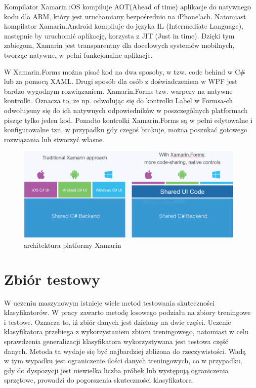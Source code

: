 \documentclass[brudnopis]{xmgr}
\begin{document}
Kompilator Xamarin.iOS kompiluje AOT(Ahead of time) aplikacje do natywnego kodu dla ARM, który jest uruchamiany bezpośrednio na iPhone’ach.
Natomiast kompilator Xamarin.Android kompiluje do języka IL (Intermediate Language), następnie by uruchomić aplikację, korzysta z JIT (Just in time).
Dzięki tym zabiegom, Xamarin jest transparentny dla docelowych systemów mobilnych, tworząc natywne, w pełni funkcjonalne aplikacje.

W Xamarin.Forms można pisać kod na dwa sposoby, w tzw. code behind w C\# lub za pomocą XAML. Drugi sposób dla osób z doświadczeniem w WPF jest bardzo wygodnym rozwiązaniem. Xamarin.Forms tzw. warpery na natywne kontrolki. Oznacza to, że np. odwołując się do kontrolki Label w Formsa-ch odwołujemy się do ich natywnych odpowiedników w poszczególnych platformach pisząc tylko jeden kod. Ponadto kontrolki Xamarin.Forms są w pełni edytowalne i konfigurowalne tzn. w przypadku gdy czegoś brakuje, można poszukać gotowego rozwiązania lub stworzyć własne.

\begin{figure}[!tbh]
\centering
\includegraphics[width=1\hsize]{fig/xamarin}
\caption{architektura platformy Xamarin}
\end{figure}
\newpage

\section{Zbiór testowy}

W uczeniu maszynowym istnieje wiele metod testowania skuteczności klasyfikatorów. W pracy zawarto metodę losowego podziału na zbiory treningowe i testowe. Oznacza to, iż zbiór danych jest dzielony na dwie części. Uczenie klasyfikatora przebiega z wykorzystaniem zbioru treningowego, natomiast w celu sprawdzenia generalizacji klasyfikatora wykorzystywana jest testowa część danych. Metoda ta wydaje się być najbardziej zbliżona do rzeczywistości. Wadą w tym wypadku jest ograniczenie ilości danych treningowych, co w przypadku, gdy do dyspozycji jest niewielka liczba próbek lub występują ograniczenia sprzętowe, prowadzi do pogorszenia skuteczności klasyfikatora.
\end{document}
